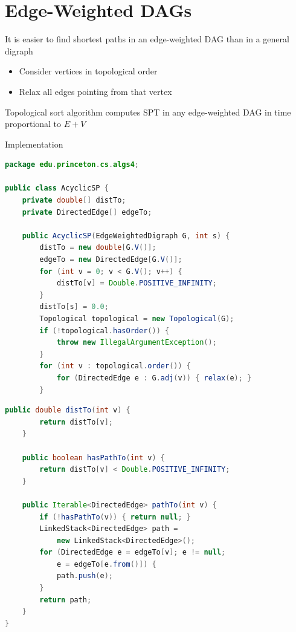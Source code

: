 \documentclass[8pt,a4paper,compress]{beamer}
\begin{document}
\section{Edge-Weighted DAGs}
\begin{frame}[fragile]
\pause

It is easier to find shortest paths in an edge-weighted DAG than in a general digraph
\begin{itemize}
\item Consider vertices in topological order

\item Relax all edges pointing from that vertex
\end{itemize}

\pause
\bigskip

Topological sort algorithm computes SPT in any edge-weighted DAG in time proportional to $E + V$

\pause
\bigskip

Implementation
\begin{lstlisting}[language=Java]
package edu.princeton.cs.algs4;

public class AcyclicSP {
    private double[] distTo; 
    private DirectedEdge[] edgeTo; 
    
    public AcyclicSP(EdgeWeightedDigraph G, int s) {
        distTo = new double[G.V()];
        edgeTo = new DirectedEdge[G.V()];
        for (int v = 0; v < G.V(); v++) {
            distTo[v] = Double.POSITIVE_INFINITY;
        }
        distTo[s] = 0.0;
        Topological topological = new Topological(G);
        if (!topological.hasOrder()) { 
            throw new IllegalArgumentException(); 
        }
        for (int v : topological.order()) {
            for (DirectedEdge e : G.adj(v)) { relax(e); }
        }
\end{lstlisting}
\end{frame}

\begin{frame}[fragile]
\pause

\begin{lstlisting}[language=Java]
    public double distTo(int v) { 
        return distTo[v]; 
    }

    public boolean hasPathTo(int v) { 
        return distTo[v] < Double.POSITIVE_INFINITY; 
    }
    
    public Iterable<DirectedEdge> pathTo(int v) {
        if (!hasPathTo(v)) { return null; }
        LinkedStack<DirectedEdge> path = 
            new LinkedStack<DirectedEdge>();
        for (DirectedEdge e = edgeTo[v]; e != null; 
            e = edgeTo[e.from()]) {
            path.push(e);
        }
        return path;
    }
}
\end{lstlisting}
\end{frame}
\end{document}
